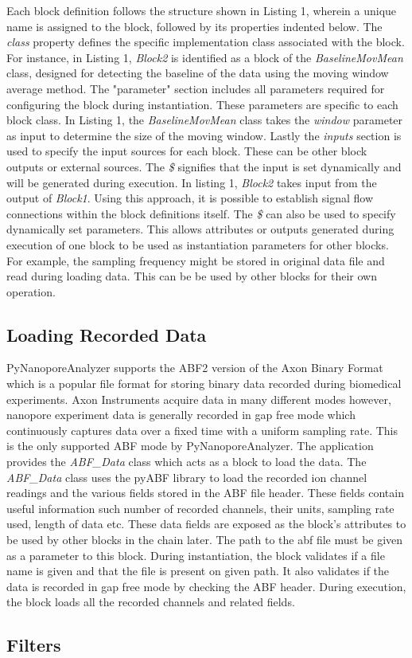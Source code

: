 \documentclass[journal]{IEEEtran}
\begin{document}
Each block definition follows the structure shown in Listing 1, wherein a unique name is assigned to the block, followed by its properties indented below. The \textit{class} property defines the specific implementation class associated with the block. For instance, in Listing 1, \textit{Block2} is identified as a block of the \textit{BaselineMovMean} class, designed for detecting the baseline of the data using the moving window average method. The "parameter" section includes all parameters required for configuring the block during instantiation. These parameters are specific to each block class. In Listing 1, the \textit{BaselineMovMean} class takes the \textit{window} parameter as input to determine the size of the moving window.  Lastly the \textit{inputs} section is used to specify the input sources for each block. These can be other block outputs or external sources. The \textit{\$} signifies that the input is set dynamically and will be generated during execution. In listing 1, \textit{Block2} takes input from the output of \textit{Block1}. Using this approach, it is possible to establish signal flow connections within the block definitions itself. The \textit{\$} can also be used to specify dynamically set parameters. This allows attributes or outputs generated during execution of one block to be used as instantiation parameters for other blocks. For example, the sampling frequency might be stored in original data file and read during loading data. This can be be used by other blocks for their own operation.

\subsection{Loading Recorded Data}
PyNanoporeAnalyzer supports the ABF2 version of the Axon Binary Format which is a popular file format for storing binary data recorded during biomedical experiments. Axon Instruments acquire data in many different modes however, nanopore experiment data is generally recorded in gap free mode which continuously captures data over a fixed time with a uniform sampling rate. This is the only supported ABF mode by PyNanoporeAnalyzer. The application provides the \textit{ABF\_Data} class which acts as a block to load the data. The \textit{ABF\_Data} class uses the pyABF library \cite{hardenPyABF2022} to load the recorded ion channel readings and the various fields stored in the ABF file header. These fields contain useful information such number of recorded channels, their units, sampling rate used, length of data etc. These data fields are exposed as the block's attributes to be used by other blocks in the chain later. The path to the abf file must be given as a parameter to this block. During instantiation, the block validates if a file name is given and that the file is present on given path. It also validates if the data is recorded in gap free mode by checking the ABF header. During execution, the block loads all the recorded channels and related fields.

\subsection{Filters}







\end{document}
